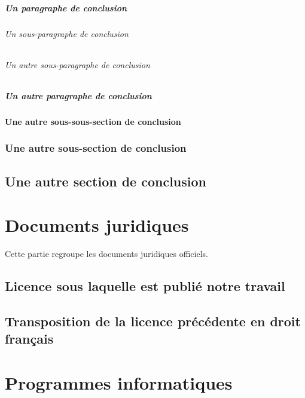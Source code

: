 \documentclass[12pt,space=onehalf,version=final]{yathesis}
\begin{document}
\paragraph{Un paragraphe de conclusion}
\lipsum[36-38]
\subparagraph{Un sous-paragraphe de conclusion}
\lipsum[39-41]
\subparagraph{Un autre sous-paragraphe de conclusion}
\lipsum[39-41]
\paragraph{Un autre paragraphe de conclusion}
\lipsum[36-38]
\subsubsection{Une autre sous-sous-section de conclusion}
\lipsum[31-37]
\subsection{Une autre sous-section de conclusion}
\lipsum[29-31]
\section{Une autre section de conclusion}
\lipsum[28-43]
%
\printbibliography
%
\appendix
%
\chapter{Documents juridiques}
\label{chap-juridique}

Cette partie regroupe les documents juridiques officiels.

\section{Licence sous laquelle est publié notre travail}
\label{sec-discours}

\lipsum[11-30]

\section{Transposition de la licence précédente en droit français}
\label{sec-autre-discours}

\lipsum[31-50]
%
\chapter{Programmes informatiques}
\label{chap-listings}
\end{document}
